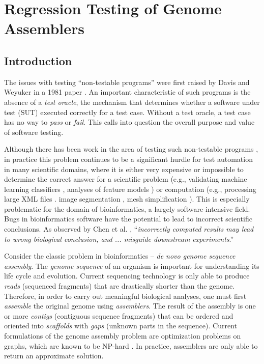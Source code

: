 \renewcommand{\thechapter}{4}
\chapter{Regression Testing of Genome Assemblers}
\section{Introduction}

The issues with testing ``non-testable programs'' were first raised by Davis
and Weyuker in a 1981 paper \cite{Davis:1981:PNP:800175.809889}. An important
characteristic of such programs is the absence of a {\it test oracle}, the
mechanism that determines whether a software under test (SUT) executed
correctly for a test case.  Without a test oracle, a test case has no way to
{\it pass} or {\it fail}. This calls into question the overall purpose and
value of software testing.

Although there has been work in the area of testing such non-testable programs
\cite{McMinn:2009:SFD:1569901.1570127,Murphy:2010:MTT:1970820,Murphy:2009:AST:1572272.1572295,Yoo:2010:MTS:1799526.1799581,Chan:2010:FFP:1815297.1815298,Chen:2002:SIM:566172.566202,Lazic:2005:AMS:1983314.1983364,Just:2010:AST:1808266.1808280,Just:2011:AUI:2036458.2036488},
in practice this problem continues to be a significant hurdle for test
automation in many scientific domains, where it is either very expensive or
impossible to determine the correct answer for a scientific problem
\cite{Hook:2009:TTS:1556904.1556936} (e.g., validating machine learning
classifiers \cite{Xie:2011:TVM:1942318.1942371}, analyses of feature models
\cite{Segura:2011:AMT:1937186.1937327}) or computation (e.g., processing large
XML files \cite{Kim-Park:2010:ATO:1868048.1868050}.  image segmentation
\cite{Frounchi:2011:AIS:2038078.2038454}, mesh simplification
\cite{chan2009pat}).  This is especially problematic for the
domain of bioinformatics, a largely software-intensive field. Bugs in
bioinformatics software have the potential to lead to incorrect scientific
conclusions.  As observed by Chen et al.  \cite{BMC}, ``{\it incorrectly
computed results may lead to wrong biological conclusion, and ...
misguide downstream experiments}.''

Consider the classic problem in bioinformatics -- {\it de novo genome sequence assembly}.  The
{\it genome sequence} of an organism is important for understanding its life
cycle and evolution.  Current sequencing technology is only able to produce
{\it reads} (sequenced fragments) that are drastically shorter than the genome.
Therefore, in order to carry out meaningful biological analyses, one must first
{\it assemble} the original genome using {\it assemblers}.  The result of the
assembly is one or more {\it contigs} (contiguous sequence fragments) that can
be ordered and oriented into {\it scaffolds} with {\it gaps} (unknown parts in
the sequence).  Current formulations of the genome assembly problem are
optimization problems on graphs, which are known to be NP-hard
\cite{medvedev2007computability}.  In practice, assemblers are only able to
return an approximate solution.

